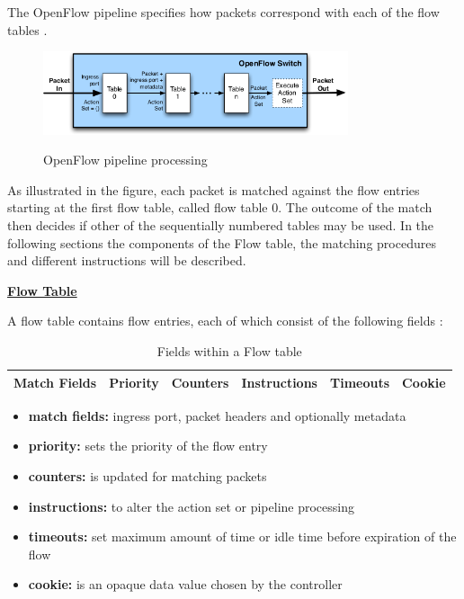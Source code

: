 The OpenFlow pipeline specifies how packets correspond with each of the flow tables \cite{ofspecification}. 

\begin{figure}[H]
\centering
\includegraphics[width=0.8\textwidth]{images/fundamentals/openflow_pipeline_processing.png}
\caption{OpenFlow pipeline processing} \cite{ofspecification}
\end{figure}

As illustrated in the figure, each packet is matched against the flow entries starting at the first flow table, called flow table 0. The outcome of the match then decides if other of the sequentially numbered tables may be used. In the following sections the components of the Flow table, the matching procedures and different instructions will be described.


\textbf{\underline{Flow Table}}

A flow table contains flow entries, each of which consist of the following fields \cite{ofspecification}: 

\begin{table}[H]
\centering

\begin{tabular}{|c|c|c|c|c|c|}
\hline Match Fields & Priority & Counters & Instructions & Timeouts & Cookie \\ 
\hline 
\end{tabular} 

\caption{Fields within a Flow table}
\end{table}

\begin{itemize}
\item \textbf{match fields:} ingress port, packet headers and optionally metadata
\item \textbf{priority:} sets the priority of the flow entry
\item \textbf{counters:} is updated for matching packets
\item \textbf{instructions:} to alter the action set or pipeline processing
\item \textbf{timeouts:} set maximum amount of time or idle time before expiration of the flow
\item \textbf{cookie:} is an opaque data value chosen by the controller
\end{itemize}

